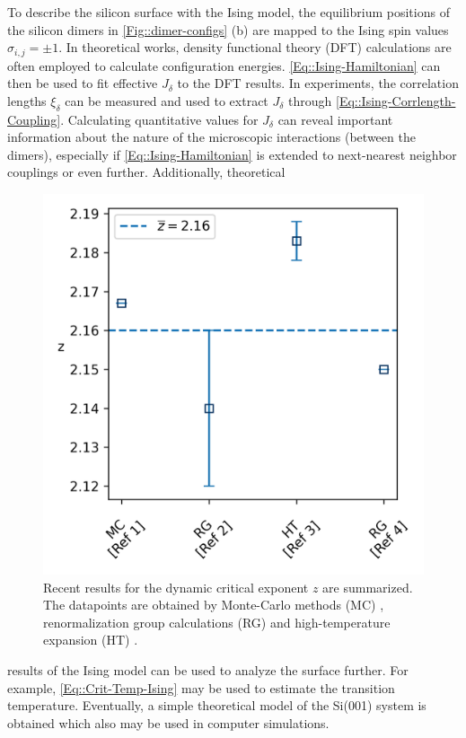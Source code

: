 	To describe the silicon surface with the Ising model, the equilibrium positions of the silicon dimers in \autoref{Fig::dimer-configs} (b) are mapped to the Ising spin values $\sigma_{i ,j} =	\pm 1$. In theoretical works, density functional theory (DFT) calculations are often employed to calculate configuration energies.   \autoref{Eq::Ising-Hamiltonian} can then be used to fit effective  $J_\delta$ to the DFT results. In experiments, the correlation lengths $\xi_\delta$ can be measured and used to extract $J_\delta$ through \autoref{Eq::Ising-Corrlength-Coupling}. Calculating quantitative values for $J_\delta$ can reveal important information about the nature of the microscopic interactions (between the dimers), especially if \autoref{Eq::Ising-Hamiltonian} is extended to next-nearest neighbor couplings or even further. Additionally, theoretical
 	\begin{figure}
	 	\includegraphics[width=\linewidth]{graphics/z-values}
	 	\caption{Recent results for the dynamic critical exponent $z$ are summarized. The datapoints are obtained by Monte-Carlo methods (MC) \cite{nightingale2000monte}, renormalization group calculations (RG) \cite{adzhemyan2022dynamic, duclut2017frequency} and high-temperature expansion (HT) \cite{dammann1993dynamical}.}
	 	\label{Figure::Ising-z-values}
	 \end{figure}
	 results of the Ising model can be used to analyze the surface further. For example, \autoref{Eq::Crit-Temp-Ising} may be used to estimate the transition temperature. Eventually, a simple theoretical model of the Si(001) system is obtained which also may be used in computer simulations.\\


